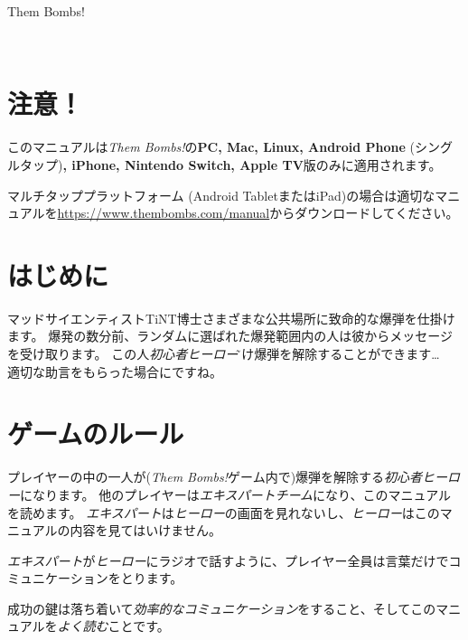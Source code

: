 \maketitle

%
\thispagestyle{empty}
\topskip=0pt
%
{%
\color{black!60!white}%
{\LARGE Them Bombs!}

\textsl{\Title}

\vspace{1em}

\Language\ \Version%
}%

\vspace{15mm}

\section*{注意！}

このマニュアルは\textit{Them Bombs!}の\textbf{PC, Mac, Linux,
Android Phone} (シングルタップ)\textbf{, iPhone, Nintendo Switch, Apple TV}版のみに適用されます。

マルチタッププラットフォーム (Android TabletまたはiPad)の場合は適切なマニュアルを\textsf{\url{https://www.thembombs.com/manual}}からダウンロードしてください。


\section*{はじめに}
マッドサイエンティストTiNT博士さまざまな公共場所に致命的な爆弾を仕掛けます。%
爆発の数分前、ランダムに選ばれた爆発範囲内の人は彼からメッセージを受け取ります。%
この人\~\textit{初心者ヒーロー}\~だけ爆弾を解除することができます…　適切な助言をもらった場合にですね。


\section*{ゲームのルール}
プレイヤーの中の一人が(\textit{Them Bombs!}ゲーム内で)爆弾を解除する\textit{初心者ヒーロー}になります。%
他のプレイヤーは\textit{エキスパートチーム}になり、このマニュアルを読めます。%
\textit{エキスパート}は\textit{ヒーロー}の画面を見れないし、\textit{ヒーロー}はこのマニュアルの内容を見てはいけません。

\textit{エキスパート}が\textit{ヒーロー}にラジオで話すように、プレイヤー全員は言葉だけでコミュニケーションをとります。

\vspace{1em}
成功の鍵は落ち着いて\textit{効率的なコミュニケーション}をすること、そしてこのマニュアルを\textit{よく読む}ことです。%

